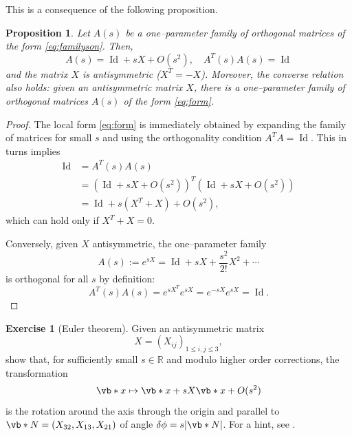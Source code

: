 \documentclass[english,fontsize=11pt,paper=b5]{scrbook}
\DeclareMathOperator{\Id}{Id}
\DeclareMathOperator{\Id}{Id}
\newtheorem{proposition}[theorem]{Proposition}
\theoremstyle{definition}
\newtheorem{exercise}{Exercise}[chapter]
\begin{document}
    This is a consequence of the following proposition.
    \begin{proposition}
      Let $A(s)$ be a one--parameter family of orthogonal matrices of the form \eqref{eq:familyson}.
      Then,
      \begin{equation}\label{eq:form}
        A(s) = \Id + sX + O(s^2), \quad A^T(s)A(s) = \Id
      \end{equation}
      and the matrix $X$ is antisymmetric ($X^T = - X$).
      Moreover, the converse relation also holds: given an antisymmetric matrix $X$, there is a one--parameter family of orthogonal matrices $A(s)$ of the form \eqref{eq:form}.
    \end{proposition}
    \begin{proof}
      The local form \eqref{eq:form} is immediately obtained by expanding the family of matrices for small $s$ and using the orthogonality condition $A^TA = \Id$.
      This in turns implies
      \begin{align}
        \Id & = A^T(s) A(s)                                                    \\
            & = \left(\Id + sX + O(s^2)\right)^T\left(\Id + sX + O(s^2)\right) \\
            & = \Id + s(X^T + X) + O(s^2),
      \end{align}
      which can hold only if $X^T + X =0$.

      Conversely, given $X$ antisymmetric, the one--parameter family
      \begin{equation}
        A(s) := e^{sX} = \Id + s X + \frac{s^2}{2!} X^2 + \cdots
      \end{equation}
      is orthogonal for all $s$ by definition:
      \begin{equation}
        A^T(s)A(s) = e^{sX^T}e^{sX} = e^{-sX} e^{sX} = \Id.
      \end{equation}
    \end{proof}

    \begin{exercise}[Euler theorem]\label{exe:rotations}
      Given an antisymmetric matrix
      \begin{equation}
        X = (X_{ij})_{1\leq i,j\leq 3},
      \end{equation}
      show that, for sufficiently small $s\in\mathbb{R}$ and modulo higher order corrections, the transformation
      \begin{equation}
        \vb*{x} \mapsto \vb*{x} + s X \vb*{x} + O(s^2)
      \end{equation}
      is the rotation around the axis through the origin and parallel to $\vb*{N}
      = (X_{32}, X_{13}, X_{21})$ of angle $\delta\phi = s|\vb*{N}|$.
      For a hint, see \cite[Chpater 26.D]{book:arnold}.
    \end{exercise}
\end{document}
